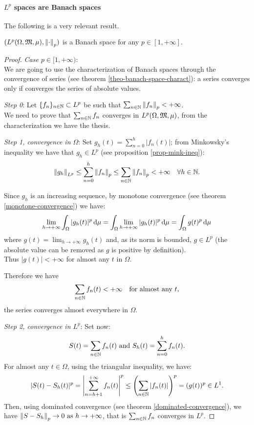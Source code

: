 \paragraph{$L^p$ spaces are Banach spaces} The following is a very relevant result.

\begin{theo}\label{Lp-norm-banach}
	$(L^p(\Omega,\mathfrak M,\mu), \left\lVert\cdot\right\rVert_p)$ is a Banach space for any $p \in [1, +\infty]$.
\end{theo}

\begin{proof} \textit{Case $p \in [1, +\infty)$}:\\
	We are going to use the characterization of Banach spaces through the convergence of series (see theorem \vref{theo-banach-space-charact}): a series converges only if converges the series of absolute values.
	
	\textit{Step 0}: Let $\{f_n\}_{n \in \mathbb N} \subset L^p$ be such that $\sum_{n\in\mathbb N} \left\lVert f_n\right\rVert_p<+\infty$.\\
	We need to prove that $\sum_{n\in\mathbb N} f_n$ converges in $L^p(\Omega,\mathfrak M,\mu)$, from the characterization we have the thesis.
	
	\textit{Step 1, convergence in $\Omega$}: Set $g_h(t) = \sum_{n=0}^{h}|f_n(t)|$; from Minkowsky's inequality we have that $g_h \in L^p$  (see proposition \vref{prop-mink-ineq}):
	$$
		\left\lVert g_h\right\rVert_{L^p} 
		\leq \sum_{n=0}^h \left\lVert f_n\right\rVert_p
		\leq \sum_{n\in \mathbb N} \left\lVert f_n\right\rVert_p 
		< + \infty \quad
		\forall h \in \mathbb N
	.
	$$
	
	Since $g_h$ is an increasing sequence, by monotone convergence (see theorem \vref{monotone-convergence}) we have:
	$$
		\lim_{h \to +\infty} \int_\Omega |g_h(t)|^p \,\mathrm d \mu
		= \int_\Omega \lim_{h \to +\infty} |g_h(t)|^p \,\mathrm d \mu
		= \int_\Omega g (t)^p \,\mathrm d \mu
	$$ 
	where $g(t) = \lim_{h \to +\infty}g_h(t)$ and, as its norm is bounded, $g \in L^p$ (the absolute value can be removed as $g$ is positive by definition).\\
	Thus $|g(t)| < +\infty$ for almost any $t$ in $\Omega$.
	
	Therefore we have 
	$$
		\sum_{n\in \mathbb N} f_n(t) 
		< +\infty
		\quad \text{for almost any } t
	,
	$$ 
	the series converges almost everywhere in $\Omega$.
	
	\textit{Step 2, convergence in $L^p$}: Set now:
	$$
		S(t)
		=\sum_{n\in \mathbb N} f_n(t) 
		\text{ and } 
		S_h(t)
		=\sum_{n=0}^{h} f_n(t)
	.
	$$
	For almost any $t \in \Omega$, using the triangular inequality, we have:
	$$
		|S(t) - S_h(t)|^p 
		= \left\lvert\sum_{n = h+1}^{+\infty} f_n(t)\right\rvert^p
		\leq \left( \sum_{n \in \mathbb N} |f_n(t)| \right)^p
		= (g(t))^p \in L^1
	.
	$$
	Then, using dominated convergence (see theorem \vref{dominated-convergence}), we have 
	$\left\lVert S-S_h\right\rVert_p \to 0 \text{ as } h\to +\infty$, that is $\sum_{n\in\mathbb N} f_n$ converges in $L^p$.
	

\end{proof}

